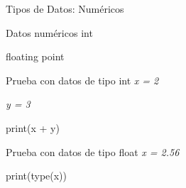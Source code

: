 \documentclass{beamer}
\begin{document}
    \begin{frame} {Tipos de Datos: Numéricos}
    \label{datos:numericos}
		\begin{block}{Datos numéricos}
			int
			
			floating point
		\end{block}
		\begin{Programexample}{Prueba con datos de tipo int}
			\centering
			\textit{x = 2}
			
			\textit{y = 3}
			
			print(x + y)
		\end{Programexample}
	\begin{Programexample}{Prueba con datos de tipo float}
		\centering\textit{x = 2.56}
		
		 print(type(x))
	\end{Programexample}
		
    \end{frame}
    
\end{document}

